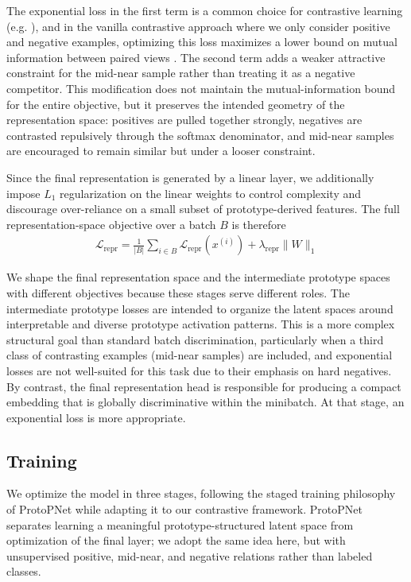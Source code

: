 \documentclass{article}
\begin{document}
The exponential loss in the first term is a common choice for contrastive learning (e.g. \cite{eldele21-tstcc,yue21-ts2vec}), and in the vanilla contrastive approach where we only consider positive and negative examples, optimizing this loss maximizes a lower bound on mutual information between paired views \cite{vandenoord19-cpc}. The second term adds a weaker attractive constraint for the mid-near sample rather than treating it as a negative competitor. This modification does not maintain the mutual-information bound for the entire objective, but it preserves the intended geometry of the representation space: positives are pulled together strongly, negatives are contrasted repulsively through the softmax denominator, and mid-near samples are encouraged to remain similar but under a looser constraint.

Since the final representation is generated by a linear layer, we additionally impose $L_1$ regularization on the linear weights to control complexity and discourage over-reliance on a small subset of prototype-derived features. The full representation-space objective over a batch $B$ is therefore 
\begin{align}
    \mathcal L_{\text{repr}} = \frac{1}{|B|} \sum_{i \in B} \mathcal L_{\text{repr}}(x^{(i)}) + \lambda_{\text{repr}} \| W \|_1
\end{align}

We shape the final representation space and the intermediate prototype spaces with different objectives because these stages serve different roles. The intermediate prototype losses are intended to organize the latent spaces around interpretable and diverse prototype activation patterns. This is a more complex structural goal than standard batch discrimination, particularly when a third class of contrasting examples (mid-near samples) are included, and exponential losses are not well-suited for this task due to their emphasis on hard negatives. By contrast, the final representation head is responsible for producing a compact embedding that is globally discriminative within the minibatch. At that stage, an exponential loss is more appropriate.

\subsection{Training}
\label{subsec:training}

We optimize the model in three stages, following the staged training philosophy of ProtoPNet while adapting it to our contrastive framework. ProtoPNet separates learning a meaningful prototype-structured latent space from optimization of the final layer; we adopt the same idea here, but with unsupervised positive, mid-near, and negative relations rather than labeled classes.
\end{document}
